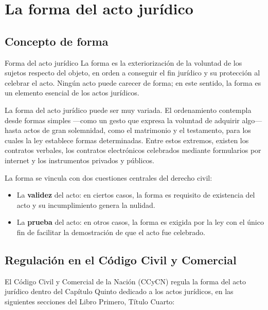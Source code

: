 \documentclass[12pt,oneside]{book}
\begin{document}
\chapter{La forma del acto jurídico}
\label{ch:forma}

\section{Concepto de forma}

\begin{definition}{Forma del acto jurídico}
La forma es la exteriorización de la voluntad de los sujetos respecto del objeto, en orden a conseguir el fin jurídico y su protección al celebrar el acto. Ningún acto puede carecer de forma; en este sentido, la forma es un elemento esencial de los actos jurídicos.
\end{definition}

La forma del acto jurídico puede ser muy variada. El ordenamiento contempla desde formas simples —como un gesto que expresa la voluntad de adquirir algo— hasta actos de gran solemnidad, como el matrimonio y el testamento, para los cuales la ley establece formas determinadas. Entre estos extremos, existen los contratos verbales, los contratos electrónicos celebrados mediante formularios por internet y los instrumentos privados y públicos.

La forma se vincula con dos cuestiones centrales del derecho civil:

\begin{itemize}
    \item La \textbf{validez} del acto: en ciertos casos, la forma es requisito de existencia del acto y su incumplimiento genera la nulidad.
    \item La \textbf{prueba} del acto: en otros casos, la forma es exigida por la ley con el único fin de facilitar la demostración de que el acto fue celebrado.
\end{itemize}

\section{Regulación en el Código Civil y Comercial}

El Código Civil y Comercial de la Nación (CCyCN) regula la forma del acto jurídico dentro del Capítulo Quinto dedicado a los actos jurídicos, en las siguientes secciones del Libro Primero, Título Cuarto:
\end{document}
